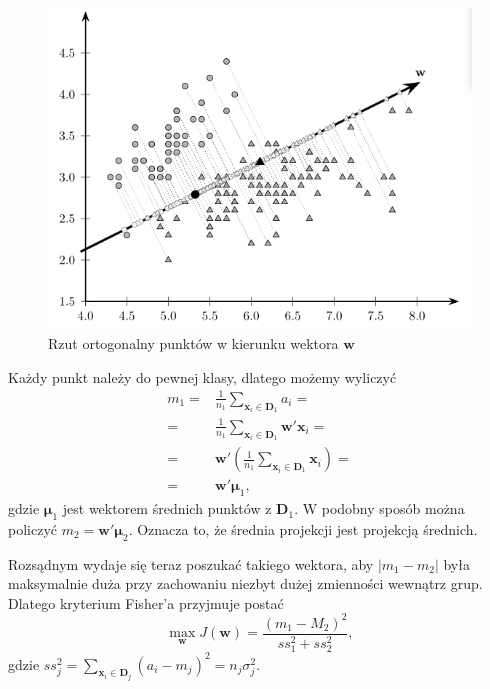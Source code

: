 \documentclass[]{book}
\theoremstyle{plain}
\theoremstyle{definition}
\theoremstyle{definition}
\theoremstyle{definition}
\theoremstyle{definition}
\theoremstyle{remark}
\begin{document}
\begin{figure}

{\centering \includegraphics[width=5.83in]{images/rzut} 

}

\caption{Rzut ortogonalny punktów w kierunku wektora $\boldsymbol w$}\label{fig:rzut}
\end{figure}

Każdy punkt należy do pewnej klasy, dlatego możemy wyliczyć
\begin{align}
    m_1=&\frac{1}{n_1}\sum_{ \boldsymbol x_i\in \boldsymbol D_1}a_i=\\
    =&\frac{1}{n_1}\sum_{ \boldsymbol x_i\in \boldsymbol D_1} \boldsymbol w' \boldsymbol x_i=\\
    =& \boldsymbol w'\left(\frac{1}{n_1}\sum_{ \boldsymbol x_i\in \boldsymbol D_1} \boldsymbol x_i \right)=\\
    =& \boldsymbol w' \boldsymbol{\mu}_1,
    \label{eq:m}
\end{align}
gdzie \(\boldsymbol \mu_1\) jest wektorem średnich punktów z \(\boldsymbol D_1\). W podobny sposób można policzyć \(m_2 = \boldsymbol w' \boldsymbol \mu_2\). Oznacza to, że średnia projekcji jest projekcją średnich.

Rozsądnym wydaje się teraz poszukać takiego wektora, aby \(|m_1-m_2|\) była maksymalnie duża przy zachowaniu niezbyt dużej zmienności wewnątrz grup. Dlatego kryterium Fisher'a przyjmuje postać
\begin{equation}
    \max_{ \boldsymbol w}J(\boldsymbol w)=\frac{(m_1-M_2)^2}{ss_1^2+ss_2^2},
    \label{eq:condFisher}
\end{equation}
gdzie \(ss_j^2=\sum_{ \boldsymbol x_i\in \boldsymbol D_j}(a_i-m_j)^2=n_j\sigma_j^2.\)
\end{document}
